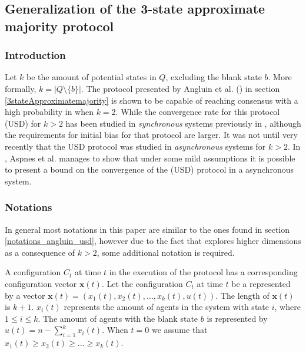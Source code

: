 \subsection{Generalization of the 3-state approximate majority protocol}

 \subsubsection{Introduction}
Let $k$ be the amount of potential states in $Q$, excluding the blank state $b$. More formally, $k = |Q \setminus \{b\}|$. The protocol presented by Angluin et al. (\cite{angluinSimplePopulationProtocol2008}) in section \ref{3stateApproximatemajority} is shown to be capable of reaching consensus with a high probability in  when $k = 2$. While the convergence rate for this protocol (USD) for $k > 2$ has been studied in \emph{synchronous} systems previously in \cite{becchetti2015}, although the requirements for initial bias for that protocol are larger. It was not until very recently that the USD protocol was studied in \emph{asynchronous} systems for $k > 2$. In \cite{AspnesFastConverganceOfKOpinion2023}, Aspnes et al. manages to show that under some mild assumptions it is possible to present a bound on the convergence of the (USD) protocol in a asynchronous system. 


\subsubsection{Notations}

In general most notations in this paper are similar to the ones found in section \ref{notations_angluin_usd}, however due to the fact that \cite{AspnesFastConverganceOfKOpinion2023} explores higher dimensions as a consequence of $k > 2$, some additional notation is required.

A configuration $C_t$ at time $t$ in the execution of the protocol has a corresponding configuration vector $\textbf{x}(t)$.  Let the configuration $C_t$ at time $t$ be a represented by a vector $\textbf{x}(t) = (x_1(t), x_2(t), ..., x_k(t), u(t))$. The length of $\textbf{x}(t)$ is $k + 1$. $x_i(t)$ represents the amount of agents in the system with state $i$, where $1 \leq i \leq k$. The amount of agents with the blank state $b$ is represented by $u(t) = n - \sum_{i=1}^k x_i(t)$. When $t = 0$ we assume that $x_1(t) \geq x_2(t) \geq ... \geq x_k(t)$. 

